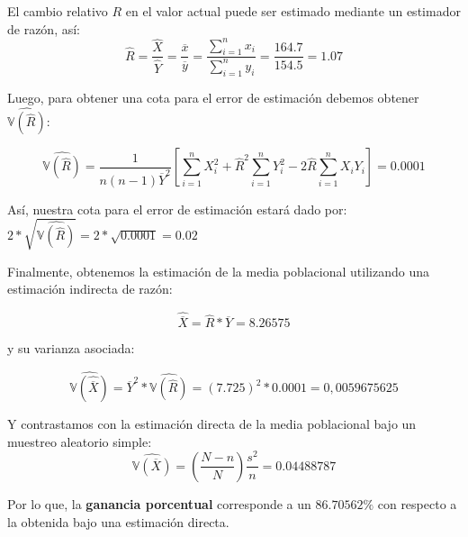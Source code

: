 \noaddpoints
{}
\begin{solution}
El cambio relativo $R$ en el valor actual puede ser estimado mediante un estimador de razón, así:
$$\hat{R}=\dfrac{\hat{X}}{\hat{Y}}=\dfrac{\overline{x}}{\overline{y}}=\dfrac{\sum_{i=1}^{n} x_i}{\sum_{i=1}^{n} y_i}=\dfrac{164.7}{154.5}=1.07$$

Luego, para obtener una cota para el error de estimación debemos obtener $\widehat{\mathbb{V}(\hat{R})}$:

$$\widehat{\mathbb{V}(\hat{R})}=\dfrac{1}{n(n-1)\overline{Y}^2}\left[ \sum_{i=1}^{n} X_{i}^2 + \hat{R}^2 \sum_{i=1}^{n} Y_{i}^2-2\hat{R} \sum_{i=1}^{n} X_i Y_i \right]=0.0001$$

Así, nuestra cota para el error de estimación estará dado por: $2*\sqrt{\widehat{\mathbb{V}(\hat{R})}}=2*\sqrt{0.0001}=0.02$

Finalmente, obtenemos la estimación de la media poblacional utilizando una estimación indirecta de razón:

$$\hat{\overline{X}}=\hat{R}*\overline{Y}=8.26575$$

y su varianza asociada:

$$\widehat{\mathbb{V}(\hat{\overline{X}})}=\overline{Y}^2 * \widehat{\mathbb{V}(\hat{R})}=(7.725)^2*0.0001=0,0059675625$$

Y contrastamos con la estimación directa de la media poblacional bajo un muestreo aleatorio simple:
$$\widehat{\mathbb{V}(\overline{X})}=\left(\dfrac{N-n}{N}\right)\dfrac{s^2}{n}=0.04488787$$

Por lo que, la \textbf{ganancia porcentual} corresponde a un $86.70562\%$ con respecto a la obtenida bajo una estimación directa.
\end{solution}